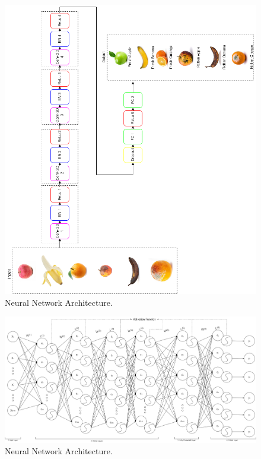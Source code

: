 \documentclass[conference]{IEEEtran}
\begin{document}
\begin{figure}[h]
    \centering
    \includegraphics[width=\linewidth]{Ai Prent.drawio (1).png}
    \caption{Neural Network Architecture.}
    \label{fig}
\end{figure}

\begin{figure}[h]
    \centering
    \includegraphics[width=\linewidth]{AI Architecture.drawio.png}
    \caption{Neural Network Architecture.}
    \label{fig}
\end{figure}
\end{document}
